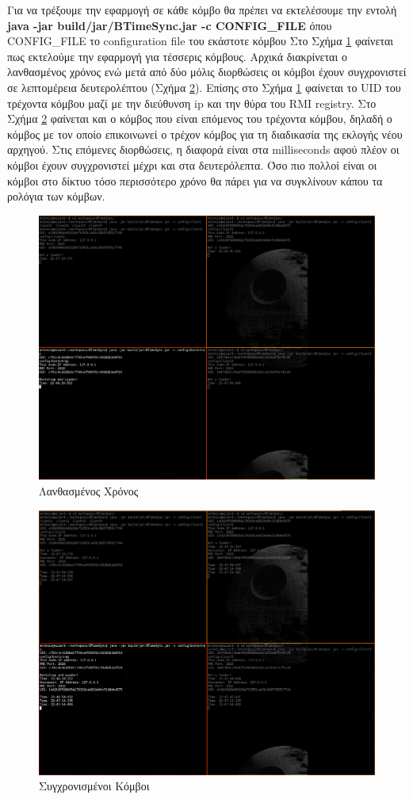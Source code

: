 \documentclass{article}
\begin{document}
Για να τρέξουμε την εφαρμογή σε κάθε κόμβο θα πρέπει να εκτελέσουμε την
εντολή \textbf{java -jar build/jar/BTimeSync.jar -c CONFIG\_FILE} όπου
CONFIG\_FILE το configuration file του εκάστοτε κόμβου Στο Σχήμα
\ref{sync_start} φαίνεται πως εκτελούμε την εφαρμογή για τέσσερις κόμβους.
Αρχικά διακρίνεται ο λανθασμένος χρόνος ενώ μετά από δύο μόλις διορθώσεις οι
κόμβοι έχουν συγχρονιστεί σε λεπτομέρεια δευτερολέπτου (Σχήμα \ref{sync_after}).
Επίσης στο Σχήμα \ref{sync_start} φαίνεται το UID του τρέχοντα κόμβου μαζί με
την διεύθυνση ip και την θύρα του RMI registry. Στο Σχήμα \ref{sync_after}
φαίνεται και ο κόμβος που είναι επόμενος του τρέχοντα κόμβου, δηλαδή ο κόμβος με
τον οποίο επικοινωνεί ο τρέχον κόμβος για τη διαδικασία της εκλογής νέου
αρχηγού.
Στις επόμενες διορθώσεις, η διαφορά είναι στα milliseconds αφού πλέον οι κόμβοι
έχουν συγχρονιστεί μέχρι και στα δευτερόλεπτα. Όσο πιο πολλοί είναι οι κόμβοι
στο δίκτυο τόσο περισσότερο χρόνο θα πάρει για να συγκλίνουν κάπου τα ρολόγια
των κόμβων.
\begin{figure}[tbh]
\centering
\includegraphics[scale=0.35]{photos/sync_start.png}
\caption{Λανθασμένος Χρόνος}
\label{sync_start}
\end{figure}

\begin{figure}[tbh]
\centering
\includegraphics[scale=0.35]{photos/sync_end.png}
\caption{Συγχρονισμένοι Κόμβοι}
\label{sync_after}
\end{figure}
\end{document}
